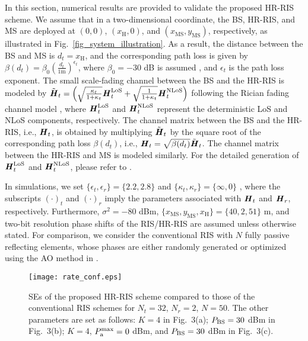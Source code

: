 \documentclass[conference]{IEEEtran}
\begin{document}
	In this section, numerical results are provided to validate the proposed HR-RIS scheme. We assume that in a two-dimensional coordinate, the BS, HR-RIS, and MS are deployed at $(0,0)$, $(x_{\mathrm{H}},0)$, and $(x_{\mathrm{MS}},y_{\mathrm{MS}})$, respectively, as illustrated in Fig.\ \ref{fig_system_illustration}. As a result, the distance between the BS and MS is $d_t = x_{\mathrm{H}}$, and the corresponding path loss is given by $\beta(d_t) = \beta_0 \left(\frac{d_t}{1\mathrm{ m}}\right)^{\epsilon_t}$, where $\beta_0 = -30$ dB is assumed \cite{wu2019intelligent, zhang2020capacity}, and $\epsilon_t$ is the path loss exponent. The small scale-fading channel between the BS and the HR-RIS is modeled by $\tilde{\textbf{\textit{H}}}_t = \left(\sqrt{\frac{\kappa_t}{1+\kappa_t}} \textbf{\textit{H}}_t^{\mathrm{LoS}} + \sqrt{\frac{1}{1+\kappa_t}} \textbf{\textit{H}}_t^{\mathrm{NLoS}}\right)$ following the Rician fading channel model \cite{wu2019intelligent, zhang2020capacity}, where $\textbf{\textit{H}}_t^{\mathrm{LoS}}$ and $\textbf{\textit{H}}_t^{\mathrm{NLoS}}$ represent the deterministic LoS and NLoS components, respectively. The channel matrix between the BS and the HR-RIS, i.e., $\textbf{\textit{H}}_t$, is obtained by multiplying $\tilde{\textbf{\textit{H}}}_t$ by the square root of the corresponding path loss $\beta(d_t)$, i.e., $\textbf{\textit{H}}_t = \sqrt{\beta(d_t)} \tilde{\textbf{\textit{H}}}_t$. The channel matrix between the HR-RIS and MS is modeled similarly. For the detailed generation of $\textbf{\textit{H}}_t^{\mathrm{LoS}}$ and $\textbf{\textit{H}}_t^{\mathrm{NLoS}}$, please refer to \cite{wu2019intelligent, zhang2020capacity}. 
	
	In simulations, we set $\{\epsilon_t,\epsilon_r\} = \{2.2,2.8\}$ and $\{\kappa_t,\kappa_r\} = \{\infty,0\}$ \cite{wu2019intelligent}, where the subscripts $(\cdot)_t$ and $(\cdot)_r$ imply the parameters associated with $\textbf{\textit{H}}_t$ and $\textbf{\textit{H}}_r$, respectively. Furthermore, $\sigma^2 = -80$ dBm, $\{x_{\mathrm{MS}}, y_{\mathrm{MS}}, x_{\mathrm{H}} \} = \{40,2,51\}$ m, and two-bit resolution phase shifts of the RIS/HR-RIS are assumed unless otherwise stated. For comparison, we consider the conventional RIS with $N$ fully passive reflecting elements, whose phases are either randomly generated or optimized using the AO method in \cite{zhang2020capacity}.
	
	\begin{figure*}[t]
		\centering
		\texttt{[image: rate\_conf.eps]}
		\caption{SEs of the proposed HR-RIS scheme compared to those of the conventional RIS schemes for $N_t = 32$, $N_r = 2$, $N = 50$. The other parameters are set as follows: $K = 4$ in Fig.\ 3(a); $P_{\mathrm{BS}} = 30$ dBm in Fig.\ 3(b); $K = 4$, $P_{\mathrm{a}}^{\mathrm{max}} = 0$ dBm, and $P_{\mathrm{BS}} = 30$ dBm in Fig.\ 3(c).}
		\label{fig_rate}
	\end{figure*}
	
\end{document}
